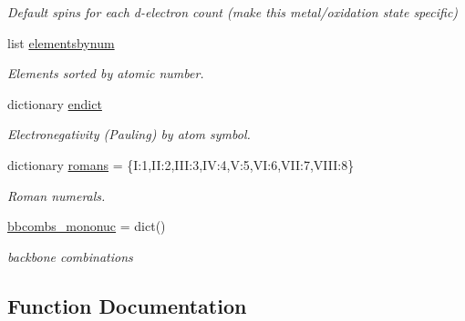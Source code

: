 \begin{DoxyCompactItemize}
\begin{DoxyCompactList}\small\item\em Default spins for each d-\/electron count (make this metal/oxidation state specific) \end{DoxyCompactList}\item 
list \hyperlink{namespacemolSimplify_1_1Classes_1_1globalvars_a257faf0e6e5695b5c8d0835360f7b054}{elementsbynum}
\begin{DoxyCompactList}\small\item\em Elements sorted by atomic number. \end{DoxyCompactList}\item 
dictionary \hyperlink{namespacemolSimplify_1_1Classes_1_1globalvars_a01f6eb6722ce46d78ee3004480cbd069}{endict}
\begin{DoxyCompactList}\small\item\em Electronegativity (Pauling) by atom symbol. \end{DoxyCompactList}\item 
dictionary \hyperlink{namespacemolSimplify_1_1Classes_1_1globalvars_a3548f27e4e3159bbb6d8ff08c0437a00}{romans} = \{\textquotesingle{}I\textquotesingle{}\+:\textquotesingle{}1\textquotesingle{},\textquotesingle{}II\textquotesingle{}\+:\textquotesingle{}2\textquotesingle{},\textquotesingle{}I\+II\textquotesingle{}\+:\textquotesingle{}3\textquotesingle{},\textquotesingle{}IV\textquotesingle{}\+:\textquotesingle{}4\textquotesingle{},\textquotesingle{}V\textquotesingle{}\+:\textquotesingle{}5\textquotesingle{},\textquotesingle{}VI\textquotesingle{}\+:\textquotesingle{}6\textquotesingle{},\textquotesingle{}V\+II\textquotesingle{}\+:\textquotesingle{}7\textquotesingle{},\textquotesingle{}V\+I\+II\textquotesingle{}\+:\textquotesingle{}8\textquotesingle{}\}
\begin{DoxyCompactList}\small\item\em Roman numerals. \end{DoxyCompactList}\item 
\hyperlink{namespacemolSimplify_1_1Classes_1_1globalvars_ab2bc502532f42e9bf3599514244c0406}{bbcombs\+\_\+mononuc} = dict()
\begin{DoxyCompactList}\small\item\em backbone combinations \end{DoxyCompactList}\end{DoxyCompactItemize}


\subsection{Function Documentation}
\mbox{\label{namespacemolSimplify_1_1Classes_1_1globalvars_a257ff4ceeae01b0f58def39acb903d95}} 
